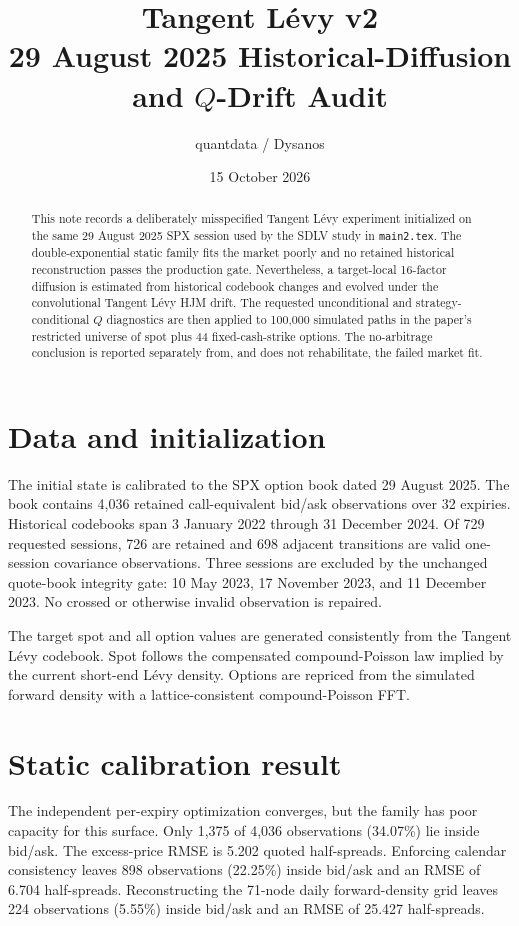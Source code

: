 \documentclass[11pt]{article}
\title{Tangent L\'evy v2\\29 August 2025 Historical-Diffusion and $Q$-Drift Audit}
\author{quantdata / Dysanos}
\date{15 October 2026}
\begin{document}
\maketitle

\begin{abstract}
This note records a deliberately misspecified Tangent L\'evy experiment
initialized on the same 29 August 2025 SPX session used by the SDLV study in
\texttt{main2.tex}.  The double-exponential static family fits the market
poorly and no retained historical reconstruction passes the production gate.
Nevertheless, a target-local 16-factor diffusion is estimated from historical
codebook changes and evolved under the convolutional Tangent L\'evy HJM drift.
The requested unconditional and strategy-conditional $Q$ diagnostics are then
applied to 100,000 simulated paths in the paper's restricted universe of spot
plus 44 fixed-cash-strike options.  The no-arbitrage conclusion is reported
separately from, and does not rehabilitate, the failed market fit.
\end{abstract}

\section{Data and initialization}

The initial state is calibrated to the SPX option book dated 29 August 2025.
The book contains 4,036 retained call-equivalent bid/ask observations over 32
expiries.  Historical codebooks span 3 January 2022 through 31 December 2024.
Of 729 requested sessions, 726 are retained and 698 adjacent transitions are
valid one-session covariance observations.  Three sessions are excluded by
the unchanged quote-book integrity gate: 10 May 2023, 17 November 2023, and
11 December 2023.  No crossed or otherwise invalid observation is repaired.

The target spot and all option values are generated consistently from the
Tangent L\'evy codebook.  Spot follows the compensated compound-Poisson law
implied by the current short-end L\'evy density.  Options are repriced from the
simulated forward density with a lattice-consistent compound-Poisson FFT.

\section{Static calibration result}

The independent per-expiry optimization converges, but the family has poor
capacity for this surface.  Only 1,375 of 4,036 observations (34.07\%) lie
inside bid/ask.  The excess-price RMSE is 5.202 quoted half-spreads.  Enforcing
calendar consistency leaves 898 observations (22.25\%) inside bid/ask and an
RMSE of 6.704 half-spreads.  Reconstructing the 71-node daily forward-density
grid leaves 224 observations (5.55\%) inside bid/ask and an RMSE of 25.427
half-spreads.
\end{document}
